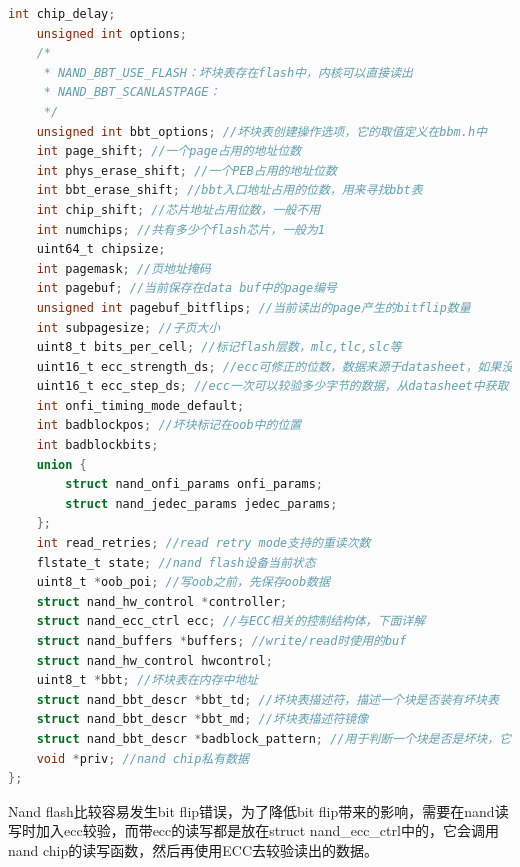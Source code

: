 \begin{lstlisting}[language=C]
	int chip_delay;
	unsigned int options;
	/*
	 * NAND_BBT_USE_FLASH：坏块表存在flash中，内核可以直接读出
	 * NAND_BBT_SCANLASTPAGE：
	 */
	unsigned int bbt_options; //坏块表创建操作选项，它的取值定义在bbm.h中
	int page_shift; //一个page占用的地址位数
	int phys_erase_shift; //一个PEB占用的地址位数
	int bbt_erase_shift; //bbt入口地址占用的位数，用来寻找bbt表
	int chip_shift; //芯片地址占用位数，一般不用
	int numchips; //共有多少个flash芯片，一般为1
	uint64_t chipsize;
	int pagemask; //页地址掩码
	int pagebuf; //当前保存在data buf中的page编号
	unsigned int pagebuf_bitflips; //当前读出的page产生的bitflip数量
	int subpagesize; //子页大小
	uint8_t bits_per_cell; //标记flash层数，mlc,tlc,slc等
	uint16_t ecc_strength_ds; //ecc可修正的位数，数据来源于datasheet，如果没有设为0
	uint16_t ecc_step_ds; //ecc一次可以较验多少字节的数据，从datasheet中获取
	int onfi_timing_mode_default;
	int badblockpos; //坏块标记在oob中的位置
	int badblockbits;
	union {
		struct nand_onfi_params	onfi_params;
		struct nand_jedec_params jedec_params;
	};
	int read_retries; //read retry mode支持的重读次数
	flstate_t state; //nand flash设备当前状态
	uint8_t *oob_poi; //写oob之前，先保存oob数据
	struct nand_hw_control *controller;
	struct nand_ecc_ctrl ecc; //与ECC相关的控制结构体，下面详解
	struct nand_buffers *buffers; //write/read时使用的buf
	struct nand_hw_control hwcontrol;
	uint8_t *bbt; //坏块表在内存中地址
	struct nand_bbt_descr *bbt_td; //坏块表描述符，描述一个块是否装有坏块表
	struct nand_bbt_descr *bbt_md; //坏块表描述符镜像
	struct nand_bbt_descr *badblock_pattern; //用于判断一个块是否是坏块，它的pattern是0xff
	void *priv; //nand chip私有数据
};

\end{lstlisting}
Nand flash比较容易发生bit flip错误，为了降低bit flip带来的影响，需要在nand读写时加入ecc较验，而带ecc的读写都是放在struct nand\_ecc\_ctrl中的，它会调用nand chip的读写函数，然后再使用ECC去较验读出的数据。

